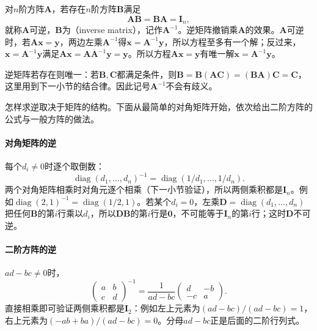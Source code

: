 对$n$阶方阵$\bm A$，若存在$n$阶方阵$\bm B$满足
\[
 \bm A\bm B=\bm B\bm A=\bm I_n,
\]
就称$\bm A$可逆，$\bm B$为（inverse matrix），记作$\bm A^{-1}$。逆矩阵撤销乘$\bm A$的效果。$\bm A$可逆时，若$\bm A\bm x=\bm y$，两边左乘$\bm A^{-1}$得$\bm x=\bm A^{-1}\bm y$，所以方程至多有一个解；反过来，$\bm x=\bm A^{-1}\bm y$满足$\bm A\bm x=\bm A\bm A^{-1}\bm y=\bm y$。所以方程$\bm A\bm x=\bm y$有唯一解$\bm x=\bm A^{-1}\bm y$。

逆矩阵若存在则唯一：若$\bm B,\bm C$都满足条件，则$\bm B=\bm B(\bm A\bm C)=(\bm B\bm A)\bm C=\bm C$，这里用到下一小节的结合律。因此记号$\bm A^{-1}$不会有歧义。

怎样求逆取决于矩阵的结构。下面从最简单的对角矩阵开始，依次给出二阶方阵的公式与一般方阵的做法。

\paragraph{对角矩阵的逆}
每个$d_i\neq0$时逐个取倒数：
\[
 \operatorname{diag}(d_1,\ldots,d_n)^{-1}=\operatorname{diag}(1/d_1,\ldots,1/d_n).
\]
两个对角矩阵相乘时对角元逐个相乘（下一小节验证），所以两侧乘积都是$\bm I_n$。例如$\operatorname{diag}(2,1)^{-1}=\operatorname{diag}(1/2,1)$。若某个$d_i=0$，左乘$\bm D=\operatorname{diag}(d_1,\ldots,d_n)$把任何$\bm B$的第$i$行乘以$d_i$，所以$\bm D\bm B$的第$i$行是$\bm0$，不可能等于$\bm I_n$的第$i$行；这时$\bm D$不可逆。

\paragraph{二阶方阵的逆}
$ad-bc\neq0$时，
\[
 \begin{pmatrix}a&b\\c&d\end{pmatrix}^{-1}=\frac1{ad-bc}\begin{pmatrix}d&-b\\-c&a\end{pmatrix}.
\]
直接相乘即可验证两侧乘积都是$\bm I_2$：例如左上元素为$(ad-bc)/(ad-bc)=1$，右上元素为$(-ab+ba)/(ad-bc)=0$。分母$ad-bc$正是后面的二阶行列式。

